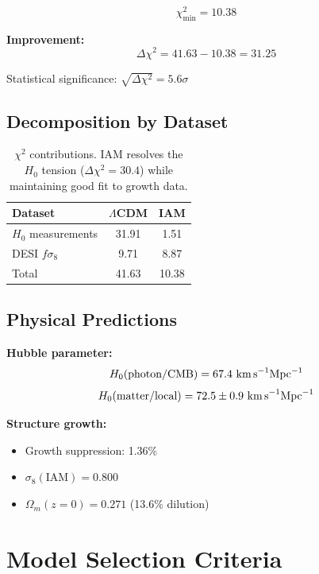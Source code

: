 \documentclass[twocolumn,superscriptaddress,prl,amsmath,amssymb]{revtex4-2}
\begin{document}
\begin{equation}
\chi^2_{\min} = 10.38
\end{equation}

\textbf{Improvement:}
\begin{equation}
\Delta\chi^2 = 41.63 - 10.38 = 31.25
\end{equation}

Statistical significance: $\sqrt{\Delta\chi^2} = 5.6\sigma$

\subsection{Decomposition by Dataset}

\begin{table}[h]
\centering
\begin{tabular}{lcc}
\hline\hline
Dataset & $\Lambda$CDM & IAM \\
\hline
$H_0$ measurements & 31.91 & 1.51 \\
DESI $f\sigma_8$ & 9.71 & 8.87 \\
\hline
Total & 41.63 & 10.38 \\
\hline\hline
\end{tabular}
\caption{$\chi^2$ contributions. IAM resolves the $H_0$ tension ($\Delta\chi^2 = 30.4$) while maintaining good fit to growth data.}
\label{tab:chi2_breakdown}
\end{table}

\subsection{Physical Predictions}

\textbf{Hubble parameter:}
\begin{equation}
H_0(\text{photon/CMB}) = 67.4 \text{ km\,s}^{-1}\text{Mpc}^{-1}
\end{equation}
\begin{equation}
H_0(\text{matter/local}) = 72.5 \pm 0.9 \text{ km\,s}^{-1}\text{Mpc}^{-1}
\end{equation}

\textbf{Structure growth:}
\begin{itemize}
\item Growth suppression: 1.36\%
\item $\sigma_8(\text{IAM}) = 0.800$
\item $\Omega_m(z=0) = 0.271$ (13.6\% dilution)
\end{itemize}

\section{Model Selection Criteria}
\end{document}
